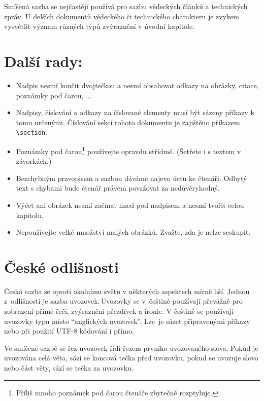 \documentclass[a4paper, 10pt, twocolumn]{article}
\begin{document}
Smíšená sazba se nejčastěji používá pro sazbu vě\-dec\-kých článků a technických zpráv.
U delších dokumentů vědeckého či technického charakteru je zvykem vysvětlit význam různých typů zvýraznění v úvodní kapitole.


\section{Další rady:}\label{3rady}
\begin{itemize}

\item Nadpis nesmí končit dvojtečkou a nesmí obsahovat odkazy na obrázky, citace, poznámky pod čarou, \dots

\item Nadpisy, číslování a odkazy na číslované elementy musí být sázeny příkazy k tomu určenými.
Čís\-lo\-vá\-ní sekcí tohoto dokumentu je zajištěno příkazem \texttt{\textbackslash section}.

\item Poznámky pod čarou\footnote{Příliš mnoho poznámek pod čarou čtenáře zbytečně rozptyluje.} používejte opravdu střídmě.
(Šetřete i s textem v závorkách.)

\item Bezchybným pravopisem a sazbou dáváme najevo úctu ke čtenáři.
Odbytý text s chybami bude čtenář právem považovat za nedůvěryhodný.

\item Výčet ani obrázek nesmí začínat hned pod nadpisem a nesmí tvořit celou kapitolu.

\item Nepoužívejte velké množství malých obrázků.
Zvažte, zda je nelze seskupit.
\end{itemize}

\section{České odlišnosti}\label{4odlisnosti}

Česká sazba se oproti okolnímu světu v některých as\-pek\-tech mírně liší.
Jednou z~odlišností je sazba uvozovek.\,U\-vo\-zov\-ky se v~češtině používají převážně pro zobrazení přímé řeči, zvýraznění přezdívek a ironie.
V češtině se používají uvozovky typu  místo ``anglických uvozovek''.
Lze~je sázet připravenými příkazy nebo při použití UTF-8 kó\-do\-vá\-ní i přímo.

Ve smíšené sazbě se řez uvozovek řídí řezem prvního uvozovaného slova.
Pokud je uvozována celá věta, sází se koncová tečka před uvozovku, pokud se uvozuje slovo nebo část věty, sází se tečka za uvozovku.
\end{document}

